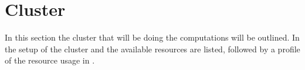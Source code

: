 \documentclass[columns=,boxcolor=white]{datart}
\begin{document}
\section{Cluster}\label{sec:cluster}
In this section the cluster that will be doing the computations will be outlined. In  the setup of the cluster and the available resources are listed, followed by a profile of the resource usage in .


%














\newpage
\appendix

%
%
\end{document}
